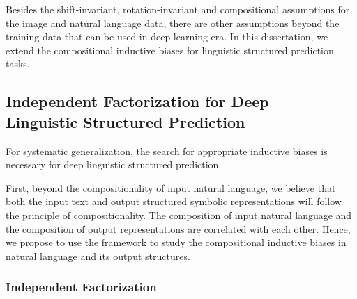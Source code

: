 Besides the shift-invariant, rotation-invariant and compositional
assumptions for the  image and natural language data, there
are other assumptions beyond the training data that can be used in
deep learning era. In this dissertation, we extend the compositional
inductive biases for linguistic structured prediction
tasks.%


%

\subsection[Independent Factorization for Deep Linguistic Structured
  Prediction]{Independent Factorization for Deep \\Linguistic Structured
  Prediction}
\label{ssec:intro:bias-dsp}

For systematic generalization, the search for appropriate inductive
biases is necessary for deep linguistic structured prediction.

First, beyond the compositionality of input natural language, we
believe that both the input text and output structured symbolic
representations will follow the principle of compositionality. The
composition of input natural language and the composition of output
representations are correlated with each other. Hence, we propose to
use the  framework to study the
compositional inductive biases in natural language and its output
structures.

\subsubsection{Independent Factorization}
\label{ssec:intro:ind-factorization}

